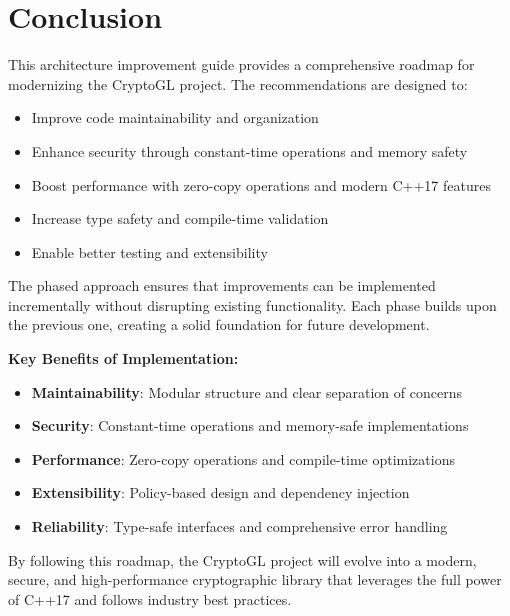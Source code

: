 \documentclass[11pt,a4paper]{article}
\begin{document}
\section{Conclusion}

This architecture improvement guide provides a comprehensive roadmap for modernizing the CryptoGL project. The recommendations are designed to:

\begin{itemize}
    \item Improve code maintainability and organization
    \item Enhance security through constant-time operations and memory safety
    \item Boost performance with zero-copy operations and modern C++17 features
    \item Increase type safety and compile-time validation
    \item Enable better testing and extensibility
\end{itemize}

The phased approach ensures that improvements can be implemented incrementally without disrupting existing functionality. Each phase builds upon the previous one, creating a solid foundation for future development.

\textbf{Key Benefits of Implementation:}
\begin{itemize}
    \item \textbf{Maintainability}: Modular structure and clear separation of concerns
    \item \textbf{Security}: Constant-time operations and memory-safe implementations
    \item \textbf{Performance}: Zero-copy operations and compile-time optimizations
    \item \textbf{Extensibility}: Policy-based design and dependency injection
    \item \textbf{Reliability}: Type-safe interfaces and comprehensive error handling
\end{itemize}

By following this roadmap, the CryptoGL project will evolve into a modern, secure, and high-performance cryptographic library that leverages the full power of C++17 and follows industry best practices.
\end{document}

